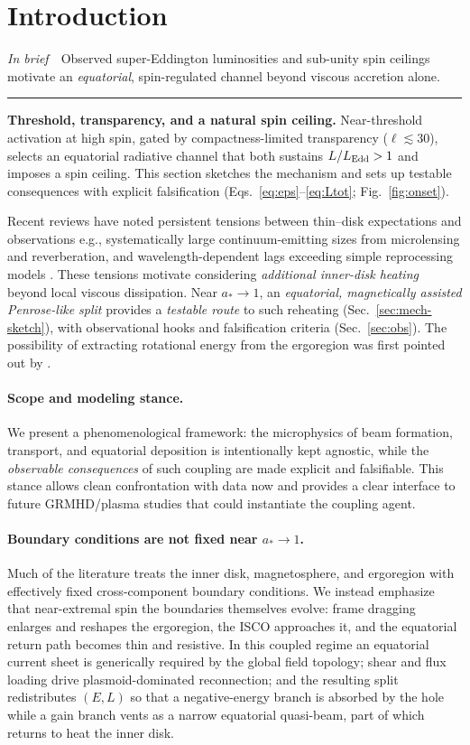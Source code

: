 \documentclass[twocolumn]{aastex701}
\newcommand{\ellcrit}{30}
\newcommand{\ellsoft}{\ell\lesssim\ellcrit}  %
\DeclareRobustCommand{\tldr}[1]{%
  \noindent\textit{In brief}\ \textemdash\ #1%
  \par\smallskip
  \noindent\rule{\columnwidth}{0.2pt}\par\medskip
}
\begin{document}
\section{Introduction}\label{sec:intro}
\tldr{Observed super-Eddington luminosities and sub-unity spin ceilings motivate an \emph{equatorial}, spin-regulated channel beyond viscous accretion alone.}
\noindent\textbf{Threshold, transparency, and a natural spin ceiling.}
Near-threshold activation at high spin, gated by compactness-limited transparency ($\ellsoft$), selects an equatorial radiative channel that both sustains $L/L_{\rm Edd}>1$ and imposes a spin ceiling.
This section sketches the mechanism and sets up testable consequences with explicit falsification (Eqs.~\eqref{eq:eps}--\eqref{eq:Ltot}; Fig.~\ref{fig:onset}).

Recent reviews have noted persistent tensions between thin--disk expectations and observations\textemdash{}
e.g., systematically large continuum-emitting sizes from microlensing and reverberation, and
wavelength-dependent lags exceeding simple reprocessing models \citep[e.g.,][]{Cackett2021RevMap,Sun2020AGNsize}.
These tensions motivate considering \emph{additional inner-disk heating} beyond local viscous dissipation.
Near $a_*\!\to\!1$, an \emph{equatorial, magnetically assisted Penrose-like split} provides a \emph{testable route}
to such reheating (Sec.~\ref{sec:mech-sketch}), with observational hooks and falsification criteria
(Sec.~\ref{sec:obs}).
The possibility of extracting rotational energy from the ergoregion was first pointed out by \cite{Penrose1969,Penrose2002}.


\paragraph{Scope and modeling stance.}
We present a phenomenological framework: the microphysics of beam formation, transport, and equatorial deposition is intentionally kept agnostic, while the \emph{observable consequences} of such coupling are made explicit and falsifiable. This stance allows clean confrontation with data now and provides a clear interface to future GRMHD/plasma studies that could instantiate the coupling agent.

\paragraph{Boundary conditions are not fixed near $a_*\!\to\!1$.}
Much of the literature treats the inner disk, magnetosphere, and ergoregion with effectively fixed cross-component boundary conditions. We instead emphasize that near-extremal spin the boundaries themselves evolve: frame dragging enlarges and reshapes the ergoregion, the ISCO approaches it, and the equatorial return path becomes thin and resistive. In this coupled regime an equatorial current sheet is generically required by the global field topology; shear and flux loading drive plasmoid-dominated reconnection; and the resulting split redistributes $(E,L)$ so that a negative-energy branch is absorbed by the hole while a gain branch vents as a narrow equatorial quasi-beam, part of which returns to heat the inner disk.
\end{document}
